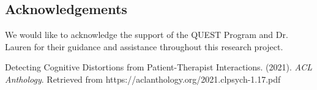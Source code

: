 \documentclass[a0,landscape]{a0poster}
\begin{document}
\begin{multicols}{4}
\color{Teal}
\section*{Acknowledgements}
\color{Black}

We would like to acknowledge the support of the QUEST Program and Dr. Lauren for their guidance and assistance throughout this research project.

\color{Teal}
\begin{thebibliography}{9}
\color{Black}

Detecting Cognitive Distortions from Patient-Therapist Interactions. (2021). \textit{ACL Anthology}. Retrieved from https://aclanthology.org/2021.clpsych-1.17.pdf
\end{thebibliography}

\end{multicols}
\end{document}
